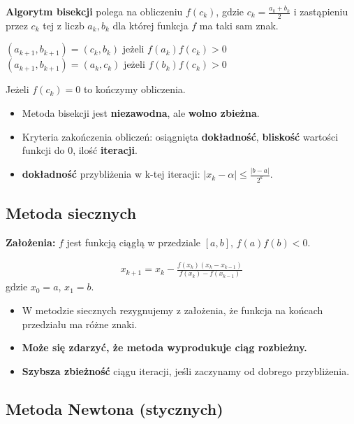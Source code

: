 \documentclass[main.tex]{subfiles}
\begin{document}
    \begin{definition}
        \textbf{Algorytm bisekcji} polega na obliczeniu $f(c_k)$, gdzie $c_k = \frac{a_k + b_k}{2}$ i zastąpieniu przez
        $c_k$ tej z liczb $a_k, b_k$ dla której funkcja $f$ ma taki sam znak.
        \begin{center}
            $(a_{k+1}, b_{k+1}) = (c_k, b_k)$ jeżeli $f(a_k)f(c_k) > 0$\\
            $(a_{k+1}, b_{k+1}) = (a_k, c_k)$ jeżeli $f(b_k)f(c_k) > 0$
        \end{center}
        Jeżeli $f(c_k) = 0$ to kończymy obliczenia.
    \end{definition}
    \begin{itemize}
        \item Metoda bisekcji jest \textbf{niezawodna}, ale \textbf{wolno zbieżna}.
        \item Kryteria zakończenia obliczeń: osiągnięta \textbf{dokładność}, \textbf{bliskość} wartości funkcji do 0,
        ilość \textbf{iteracji}.
        \item \textbf{dokładność} przybliżenia w k-tej iteracji: $|x_k - \alpha| \leq \frac{|b - a|}{2^k}$.
    \end{itemize}


    \subsection{Metoda siecznych}

    \textbf{Założenia:} $f$ jest funkcją ciągłą w przedziale $[a,b]$, $f(a)f(b) < 0$.

    \begin{align*}
        x_{k+1} = x_k - \frac{f(x_k)(x_k - x_{k-1})}{f(x_k) - f(x_{k-1})}
    \end{align*}
    gdzie $x_0 = a$, $x_1 = b$.

    \begin{itemize}
        \item W metodzie siecznych rezygnujemy z założenia, że funkcja na końcach przedziału ma różne znaki.
        \item \textbf{Może się zdarzyć, że metoda wyprodukuje ciąg rozbieżny.}
        \item \textbf{Szybsza zbieżność} ciągu iteracji, jeśli zaczynamy od dobrego przybliżenia.
    \end{itemize}

    \subsection{Metoda Newtona (stycznych)}
\end{document}
